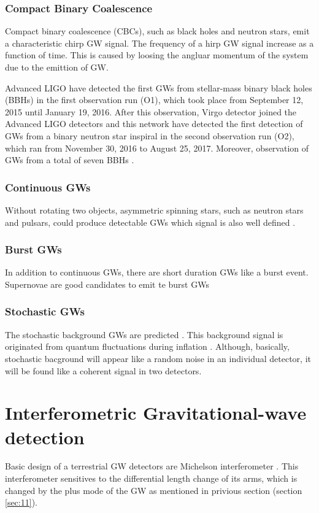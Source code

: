 \subsubsection{Compact Binary Coalescence}
Compact binary coalescence (CBCs), such as black holes and neutron stars, emit a characteristic chirp GW signal. The frequency of a hirp GW signal increase as a function of time. This is caused by loosing the angluar momentum of the system due to the emittion of GW. 

Advanced LIGO have detected the first GWs from stellar-mass binary black holes (BBHs) in the first observation run (O1), which took place from September 12, 2015 until January 19, 2016. After this observation, Virgo detector joined the Advanced LIGO detectors and this network have detected the first detection of GWs from a binary neutron star inspiral in the second observation run (O2), which ran from November 30, 2016 to August 25, 2017. Moreover, observation of GWs from a total of seven BBHs \cite{abbott2019gwtc}.

\subsubsection{Continuous GWs}
Without rotating two objects, asymmetric spinning stars, such as neutron stars and pulsars, could produce detectable GWs which signal is also well defined \cite{leaci2012searching,hereld1984search}.

\subsubsection{Burst GWs}
In addition to continuous GWs, there are short duration GWs like a burst event. Supernovae are good candidates to emit te burst GWs \cite{ott2004gravitational}

\subsubsection{Stochastic GWs}
The stochastic background GWs are predicted \cite{starobinskii1979spectrum,Christensen_2018}. This background signal is originated from quantum fluctuations during inflation \cite{PhysRevD.23.347}. Although, basically, stochastic bacground will appear like a random noise in an individual detector, it will be found like a coherent signal in two detectors.

\section{Interferometric Gravitational-wave detection} \label{sec:12}
Basic design of a terrestrial GW detectors are Michelson interferometer \cite{weiss1972electronically}. This interferometer sensitives to the differential length change of its arms, which is changed by the plus mode of the GW as mentioned in privious section (section \ref{sec:11}).

